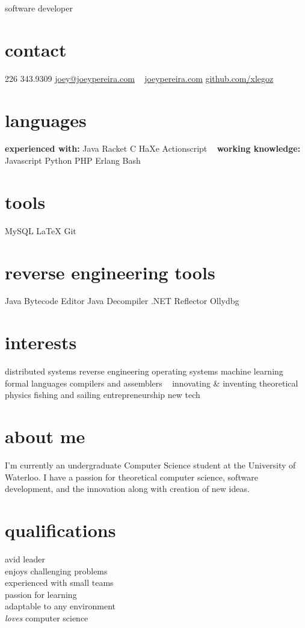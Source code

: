 \documentclass[]{friggeri-cv}
\begin{document}
       {software developer}

\begin{aside}
  \section{contact}
    226 343.9309
    \href{mailto:joey@joeypereira.com}{joey@joeypereira.com}
    ~
    \href{http://joeypereira.com}{joeypereira.com}
    \href{http://www.github.com/xlegoz}{github.com/xlegoz}
  \section{languages}
  \textbf{experienced with:}
  	Java
  	Racket
  	C
  	HaXe
  	Actionscript
	~
	\textbf{working knowledge:}
	Javascript
	Python
  	PHP
	Erlang
	Bash
  \section{tools}
    MySQL
    \LaTeX
	Git
  \section{reverse engineering tools}
  	Java Bytecode Editor
  	Java Decompiler
  	.NET Reflector
  	Ollydbg
  \section{interests}
  	distributed systems
  	reverse engineering
  	operating systems
  	machine learning
  	formal languages
  	compilers and assemblers
  	~
	innovating \& inventing
  	theoretical physics
  	fishing and sailing
  	entrepreneurship
  	new tech
\end{aside}


\section{about me}
I'm currently an undergraduate Computer Science student at the University of Waterloo. I have a passion for theoretical computer science, software development, and the innovation along with creation of new ideas.
\section{qualifications}
\begin{multicols}{3}
 avid leader \\ enjoys challenging problems \\ experienced with small teams \\ passion for learning \\ adaptable to any environment \\ {\em loves} computer science
\end{multicols}
\end{document}
